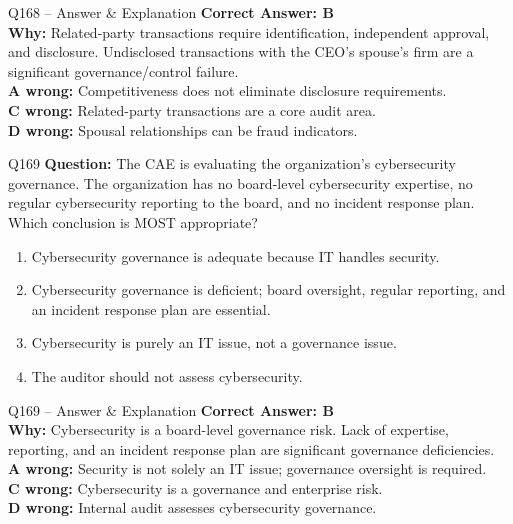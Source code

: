 \documentclass[aspectratio=169,10pt]{beamer}
\begin{document}
	\begin{frame}[t]{Q168 -- Answer \& Explanation}
		\small
		\textbf{Correct Answer: B} \\[4pt]
		\textbf{Why:} Related-party transactions require identification, independent approval, and disclosure. Undisclosed transactions with the CEO's spouse's firm are a significant governance/control failure. \\[4pt]
		\textbf{A wrong:} Competitiveness does not eliminate disclosure requirements. \\[2pt]
		\textbf{C wrong:} Related-party transactions are a core audit area. \\[2pt]
		\textbf{D wrong:} Spousal relationships can be fraud indicators.
	\end{frame}
	
	\begin{frame}[t]{Q169}
		\small
		\textbf{Question:} The CAE is evaluating the organization's cybersecurity governance. The organization has no board-level cybersecurity expertise, no regular cybersecurity reporting to the board, and no incident response plan. Which conclusion is MOST appropriate?
		\begin{enumerate}[label=\Alph*.,itemsep=1pt,topsep=2pt]
			\item Cybersecurity governance is adequate because IT handles security.
			\item Cybersecurity governance is deficient; board oversight, regular reporting, and an incident response plan are essential.
			\item Cybersecurity is purely an IT issue, not a governance issue.
			\item The auditor should not assess cybersecurity.
		\end{enumerate}
	\end{frame}
	
	\begin{frame}[t]{Q169 -- Answer \& Explanation}
		\small
		\textbf{Correct Answer: B} \\[4pt]
		\textbf{Why:} Cybersecurity is a board-level governance risk. Lack of expertise, reporting, and an incident response plan are significant governance deficiencies. \\[4pt]
		\textbf{A wrong:} Security is not solely an IT issue; governance oversight is required. \\[2pt]
		\textbf{C wrong:} Cybersecurity is a governance and enterprise risk. \\[2pt]
		\textbf{D wrong:} Internal audit assesses cybersecurity governance.
	\end{frame}
	
\end{document}
